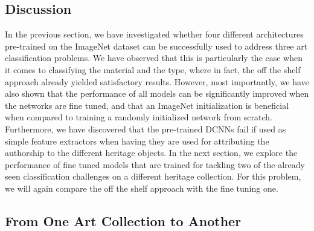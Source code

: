 

\subsection{Discussion}
\label{subsec: RijksDiscussion}
In the previous section, we have investigated whether four different architectures pre-trained on the ImageNet dataset can be successfully used to address three art classification problems. We have observed that this is particularly the case when it comes to classifying the material and the type, where in fact, the off the shelf approach already yielded satisfactory results. However, most importantly, we have also shown that the performance of all models can be significantly improved when the networks are fine tuned, and that an ImageNet initialization is beneficial when compared to training a randomly initialized network from scratch. Furthermore, we have discovered that the pre-trained DCNNs fail if used as simple feature extractors when having they are used for attributing the authorship to the different heritage objects. In the next section, we explore the performance of fine tuned models that are trained for tackling two of the already seen classification challenges on a different heritage collection. For this problem, we will again compare the off the shelf approach with the fine tuning one.


\subsection{From One Art Collection to Another} 
\label{subsec: from_one_to_another}

